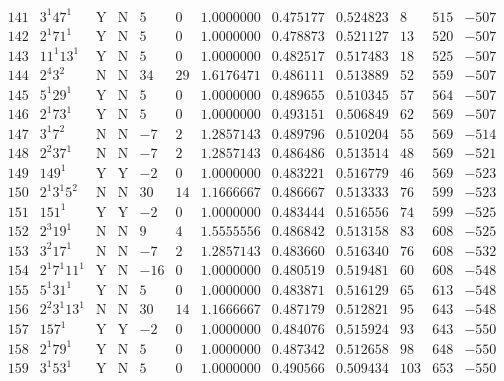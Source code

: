 \documentclass[11pt,reqno,a4letter]{article}
\numberwithin{figure}{section}
\numberwithin{table}{section}
\theoremstyle{plain}
\numberwithin{theorem}{section}
\theoremstyle{definition}
\begin{document}
\begin{table}[ht]
\begin{equation*}
{\begin{array}{cc|cc|ccc|cc|ccc}
 141 & 3^1 47^1 & \text{Y} & \text{N} & 5 & 0 & 1.0000000 & 0.475177 & 0.524823 & 8 & 515 & -507 \\
 142 & 2^1 71^1 & \text{Y} & \text{N} & 5 & 0 & 1.0000000 & 0.478873 & 0.521127 & 13 & 520 & -507 \\
 143 & 11^1 13^1 & \text{Y} & \text{N} & 5 & 0 & 1.0000000 & 0.482517 & 0.517483 & 18 & 525 & -507 \\
 144 & 2^4 3^2 & \text{N} & \text{N} & 34 & 29 & 1.6176471 & 0.486111 & 0.513889 & 52 & 559 & -507 \\
 145 & 5^1 29^1 & \text{Y} & \text{N} & 5 & 0 & 1.0000000 & 0.489655 & 0.510345 & 57 & 564 & -507 \\
 146 & 2^1 73^1 & \text{Y} & \text{N} & 5 & 0 & 1.0000000 & 0.493151 & 0.506849 & 62 & 569 & -507 \\
 147 & 3^1 7^2 & \text{N} & \text{N} & -7 & 2 & 1.2857143 & 0.489796 & 0.510204 & 55 & 569 & -514 \\
 148 & 2^2 37^1 & \text{N} & \text{N} & -7 & 2 & 1.2857143 & 0.486486 & 0.513514 & 48 & 569 & -521 \\
 149 & 149^1 & \text{Y} & \text{Y} & -2 & 0 & 1.0000000 & 0.483221 & 0.516779 & 46 & 569 & -523 \\
 150 & 2^1 3^1 5^2 & \text{N} & \text{N} & 30 & 14 & 1.1666667 & 0.486667 & 0.513333 & 76 & 599 & -523 \\
 151 & 151^1 & \text{Y} & \text{Y} & -2 & 0 & 1.0000000 & 0.483444 & 0.516556 & 74 & 599 & -525 \\
 152 & 2^3 19^1 & \text{N} & \text{N} & 9 & 4 & 1.5555556 & 0.486842 & 0.513158 & 83 & 608 & -525 \\
 153 & 3^2 17^1 & \text{N} & \text{N} & -7 & 2 & 1.2857143 & 0.483660 & 0.516340 & 76 & 608 & -532 \\
 154 & 2^1 7^1 11^1 & \text{Y} & \text{N} & -16 & 0 & 1.0000000 & 0.480519 & 0.519481 & 60 & 608 & -548 \\
 155 & 5^1 31^1 & \text{Y} & \text{N} & 5 & 0 & 1.0000000 & 0.483871 & 0.516129 & 65 & 613 & -548 \\
 156 & 2^2 3^1 13^1 & \text{N} & \text{N} & 30 & 14 & 1.1666667 & 0.487179 & 0.512821 & 95 & 643 & -548 \\
 157 & 157^1 & \text{Y} & \text{Y} & -2 & 0 & 1.0000000 & 0.484076 & 0.515924 & 93 & 643 & -550 \\
 158 & 2^1 79^1 & \text{Y} & \text{N} & 5 & 0 & 1.0000000 & 0.487342 & 0.512658 & 98 & 648 & -550 \\
 159 & 3^1 53^1 & \text{Y} & \text{N} & 5 & 0 & 1.0000000 & 0.490566 & 0.509434 & 103 & 653 & -550 \\

\end{array}}
\end{equation*}
\end{table}
\end{document}
